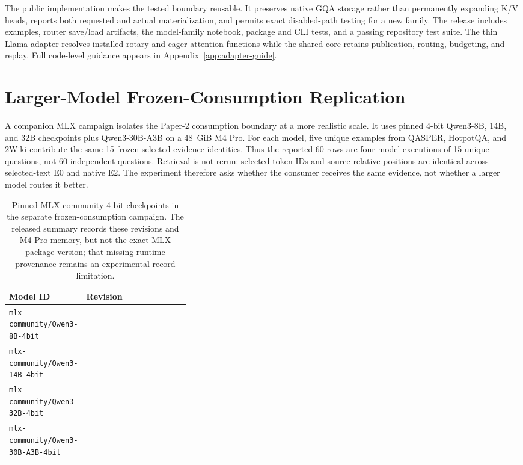 \documentclass[11pt]{article}
\begin{document}
The public implementation makes the tested boundary reusable. It preserves native GQA storage
rather than permanently expanding K/V heads, reports both requested and actual materialization,
and permits exact disabled-path testing for a new family. The release includes examples, router
save/load artifacts, the model-family notebook, package and CLI tests, and a passing repository
test suite. The thin Llama adapter resolves installed rotary and eager-attention functions while
the shared core retains publication, routing, budgeting, and replay. Full code-level guidance
appears in Appendix~\ref{app:adapter-guide}.

\section{Larger-Model Frozen-Consumption Replication}
\label{sec:large-frozen-consumption}

A companion MLX campaign isolates the Paper-2 consumption boundary at a more
realistic scale. It uses pinned 4-bit Qwen3-8B, 14B, and 32B checkpoints plus
Qwen3-30B-A3B on a 48~GiB M4 Pro. For each model, five unique examples from
QASPER, HotpotQA, and 2Wiki contribute the same 15 frozen selected-evidence identities. Thus the
reported 60 rows are four model executions of 15 unique questions, not 60 independent questions.
Retrieval is not rerun: selected token IDs and source-relative positions are
identical across selected-text E0 and native E2. The experiment therefore asks
whether the consumer receives the same evidence, not whether a larger model
routes it better.

\begin{table}[H]
\centering
\scriptsize
\caption{Pinned MLX-community 4-bit checkpoints in the separate frozen-consumption campaign.
The released summary records these revisions and M4 Pro memory, but not the exact MLX package
version; that missing runtime provenance remains an experimental-record limitation.}
\label{tab:mlx-consumption-provenance}
\begin{tabularx}{\linewidth}{L{0.35\linewidth}Y}
\toprule
Model ID & Revision \\
\midrule
\texttt{mlx-community/Qwen3-8B-4bit} &  \\
\texttt{mlx-community/Qwen3-14B-4bit} &  \\
\texttt{mlx-community/Qwen3-32B-4bit} &  \\
\texttt{mlx-community/Qwen3-30B-A3B-4bit} &  \\
\bottomrule
\end{tabularx}
\end{table}
\end{document}

